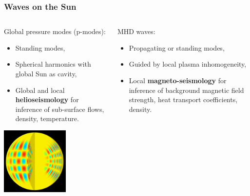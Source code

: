 \documentclass[table]{beamer}
\begin{document}
\begin{frame}
\frametitle{Waves on the Sun}
\begin{columns}
\begin{column}{0.5\textwidth}
    \begin{center}
	Global pressure modes (p-modes):
	\begin{itemize}
	\item Standing modes,
	\item Spherical harmonics with global Sun as cavity,
	\item Global and local \textbf{helioseismology} for inference of sub-surface flows, density, temperature.
	\end{itemize}
    \includegraphics[width=0.6\textwidth]{media/helioseismology.png}
	\end{center}
\end{column}
\begin{column}{0.5\textwidth}
    \begin{center}
    MHD waves:
	\begin{itemize}
	\item Propagating or standing modes,
	\item Guided by local plasma inhomogeneity,
	\item Local \textbf{magneto-seismology} for inference of background magnetic field strength, heat transport coefficients, density.
	\end{itemize}

\end{center}
\end{column}
\end{columns}
\end{frame}
\end{document}
